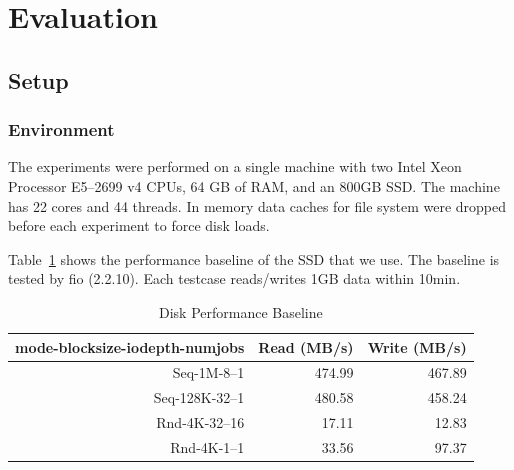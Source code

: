 \section{Evaluation}\label{sec:experiments}
\subsection{Setup}
\subsubsection{Environment}
The experiments were performed on a single machine with two Intel Xeon Processor E5--2699 v4 CPUs, 64 GB of RAM,
and an 800GB SSD\@.
The machine has 22 cores and 44 threads.
In memory data caches for file system were dropped before each experiment to force disk loads.

Table~\ref{tab:disk} shows the performance baseline of the SSD that we use.
The baseline is tested by fio (2.2.10).
Each testcase reads/writes 1GB data within 10min.
\begin{table}
  \caption{Disk Performance Baseline}\label{tab:disk}
  \begin{tabular}{rrr}
    \toprule
    mode-blocksize-iodepth-numjobs & Read (MB/s) & Write (MB/s) \\
    \midrule
    Seq-1M-8--1    & 474.99 & 467.89 \\
    Seq-128K-32--1 & 480.58 & 458.24 \\
    Rnd-4K-32--16  &  17.11 &  12.83 \\
    Rnd-4K-1--1    &  33.56 &  97.37 \\
    \bottomrule
  \end{tabular}
\end{table}
